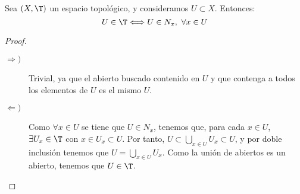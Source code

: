 \begin{prop}\label{prop:CaractAbiertos_conEntornos}
    Sea $(X,\T)$ un espacio topológico, y consideramos $U\subset X$. Entonces:
    \begin{equation*}
        U\in \T\Longleftrightarrow U\in N_x,~\forall x\in U
    \end{equation*}
\end{prop}
\begin{proof}\
    \begin{description}
        \item [$\Longrightarrow)$] Trivial, ya que el abierto buscado contenido en $U$ y que contenga a todos los elementos de $U$ es el mismo $U$. 

        \item [$\Longleftarrow)$] Como $\forall x\in U$ se tiene que $U\in N_x$, tenemos que, para cada $x\in U$, $\exists U_x\in \T$ con $x\in U_x\subset U$. Por tanto, $U\subset \bigcup\limits_{x\in U}U_x\subset U$, y por doble inclusión tenemos que $U=\bigcup\limits_{x\in U}U_x$.
        Como la unión de abiertos es un abierto, tenemos que $U\in \T$.
    \end{description}
\end{proof}


